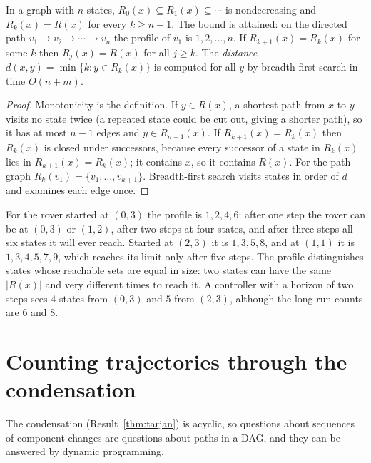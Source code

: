 \begin{newresult}\label{prop:profile}
In a graph with $n$ states, $R_0(x)\subseteq R_1(x)\subseteq\cdots$ is nondecreasing and $R_k(x)=R(x)$ for every $k\ge n-1$. The bound is attained: on the directed path $v_1\to v_2\to\cdots\to v_n$ the profile of $v_1$ is $1,2,\dots,n$. If $R_{k+1}(x)=R_k(x)$ for some $k$ then $R_j(x)=R(x)$ for all $j\ge k$. The \emph{distance} $d(x,y)=\min\{k:y\in R_k(x)\}$ is computed for all $y$ by breadth-first search in time $O(n+m)$.
\end{newresult}
\begin{proof}
Monotonicity is the definition. If $y\in R(x)$, a shortest path from $x$ to $y$ visits no state twice (a repeated state could be cut out, giving a shorter path), so it has at most $n-1$ edges and $y\in R_{n-1}(x)$. If $R_{k+1}(x)=R_k(x)$ then $R_k(x)$ is closed under successors, because every successor of a state in $R_k(x)$ lies in $R_{k+1}(x)=R_k(x)$; it contains $x$, so it contains $R(x)$. For the path graph $R_k(v_1)=\{v_1,\dots,v_{k+1}\}$. Breadth-first search visits states in order of $d$ and examines each edge once.
\end{proof}

For the rover started at $(0,3)$ the profile is $1,2,4,6$: after one step the rover can be at $(0,3)$ or $(1,2)$, after two steps at four states, and after three steps all six states it will ever reach. Started at $(2,3)$ it is $1,3,5,8$, and at $(1,1)$ it is $1,3,4,5,7,9$, which reaches its limit only after five steps. The profile distinguishes states whose reachable sets are equal in size: two states can have the same $|R(x)|$ and very different times to reach it. A controller with a horizon of two steps sees $4$ states from $(0,3)$ and $5$ from $(2,3)$, although the long-run counts are $6$ and $8$.

\section{Counting trajectories through the condensation}\label{sec:count-traj}

The condensation (Result~\ref{thm:tarjan}) is acyclic, so questions about sequences of component changes are questions about paths in a DAG, and they can be answered by dynamic programming.

